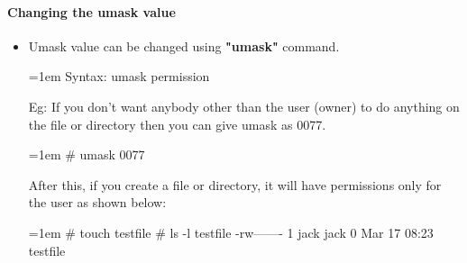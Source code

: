 \begin{flushleft}
\newpage
		
		
	\paragraph{Changing the umask value}
	\begin{itemize}
		\item Umask value can be changed using \textbf{"umask"} command.
		\bigskip
		\begin{tcolorbox}[breakable,notitle,boxrule=0pt,colback=pink,colframe=pink]
			\color{black}
			\font=1em
			Syntax: umask permission
			\font=4pt
		\end{tcolorbox}
		Eg: If you don’t want anybody other than the user (owner) to do anything on the file or directory then you can give umask as 0077.
		\bigskip
		\begin{tcolorbox}[breakable,notitle,boxrule=-0pt,colback=black,colframe=black]
			\color{green}
			\font=1em
			\# umask 0077
			\font=4pt
		\end{tcolorbox}
		\bigskip
		After this, if you create a file or directory, it will have permissions only for the user
		as shown below:
		\bigskip
		\begin{tcolorbox}[breakable,notitle,boxrule=-0pt,colback=black,colframe=black]
			\color{green}
			\font=1em
			\# touch testfile
			\newline
			\# ls -l testfile
			\newline
			\color{white}
			-rw------- 1 jack jack 0 Mar 17 08:23 testfile
			\font=4pt
		\end{tcolorbox}
		
	\end{itemize}

	
\end{flushleft}

\newpage

